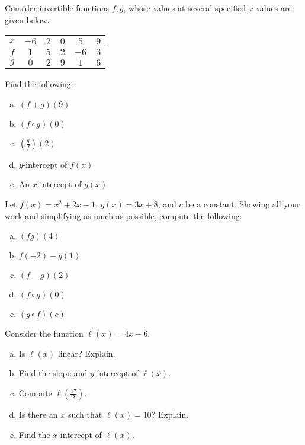 \documentclass[12pt,letterpaper]{exam}
\begin{document}
\begin{questions}
\newpage
\question[10] Consider invertible functions $f, g$, whose values at several specified $x$-values are given below. 
	\begin{table}[h]
	\centering
	\begin{tabular}{|c||c|c|c|c|c|} \hline
	$x$ & $-6$ & $2$ & $0$ & $5$ & $9$ \\ \hline
	$f$ & $1$ & $5$ & $2$ & $-6$ & $3$ \\ \hline
	$g$ & $0$ & $2$ & $9$ & $1$ & $6$ \\ \hline
	\end{tabular}
	\end{table}
Find the following:
	\begin{enumerate}[(a)]
	\item $(f + g)(9)$
	\item $(f \circ g)(0)$
	\item $\left( \frac{g}{f} \right)(2)$
	\item $y$-intercept of $f(x)$
	\item An $x$-intercept of $g(x)$
	\end{enumerate}



\newpage
\question[10] Let $f(x)= x^2 + 2x - 1$, $g(x)= 3x + 8$, and $c$ be a constant. Showing all your work and simplifying as much as possible, compute the following:
	\begin{enumerate}[(a)]
	\item $(fg)(4)$
	\item $f(-2) - g(1)$
	\item $(f - g)(2)$
	\item $(f \circ g)(0)$
	\item $(g \circ f)(c)$
	\end{enumerate}



\newpage
\question[10] Consider the function $\ell(x)= 4x - 6$.
	\begin{enumerate}[(a)]
	\item Is $\ell(x)$ linear? Explain. 
	\item Find the slope and $y$-intercept of $\ell(x)$. 
	\item Compute $\ell(\frac{17}{2})$. 
	\item Is there an $x$ such that $\ell(x)= 10$? Explain. 
	\item Find the $x$-intercept of $\ell(x)$. 
	\end{enumerate}




\end{questions}
\end{document}
